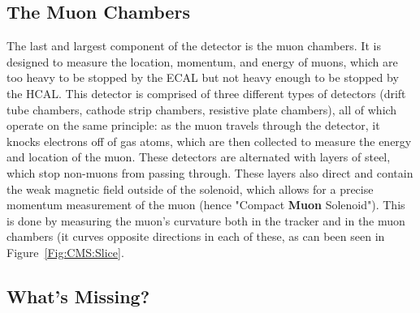 \subsection{The Muon Chambers}

The last and largest component of the detector is the muon chambers. It is designed to measure the location, momentum, and energy of muons, which are too heavy to be stopped by the ECAL but not heavy enough to be stopped by the HCAL. This detector is comprised of three different types of detectors (drift tube chambers, cathode strip chambers, resistive plate chambers), all of which operate on the same principle: as the muon travels through the detector, it knocks electrons off of gas atoms, which are then collected to measure the energy and location of the muon. These detectors are alternated with layers of steel, which stop non-muons from passing through. These layers also direct and contain the weak magnetic field outside of the solenoid, which allows for a precise momentum measurement of the muon (hence "Compact \textbf{Muon} Solenoid"). This is done by measuring the muon's curvature both in the tracker and in the muon chambers (it curves opposite directions in each of these, as can been seen in Figure~\ref{Fig:CMS:Slice}.
\vspace{5mm}

\subsection{What's Missing?}

